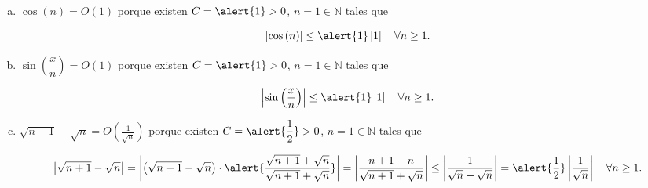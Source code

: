 \documentclass[
	spanish,
	8pt,
	utf8,
	xcolor=table,
	handout,
	aspectratio=169,
	professionalfonts,
	mathserif,
	leqno,
]{beamer}
\begin{document}
\begin{frame}
\begin{solution}
\begin{enumerate}[a)]
			\item

			      \begin{math}
				      \cos\left(n\right)=
				      O\left(1\right)
			      \end{math}
			      porque existen $C=\alert{1}>0$, $n=1\in\mathbb{N}$ tales
			      que

			      \begin{equation*}
				      \left|
				      \cos\left(n\right)
				      \right|\leq
				      \alert{1}\left|
				      1
				      \right|\quad
				      \forall n\geq 1.
			      \end{equation*}

			\item

			      \begin{math}
				      \sin\left(\dfrac{x}{n}\right)=
				      O\left(1\right)
			      \end{math}
			      porque existen $C=\alert{1}>0$, $n=1\in\mathbb{N}$ tales
			      que

			      \begin{equation*}
				      \left|
				      \sin\left(\frac{x}{n}\right)
				      \right|\leq
				      \alert{1}\left|
				      1
				      \right|\quad
				      \forall n\geq 1.
			      \end{equation*}

			\item

			      \begin{math}
				      \sqrt{n+1}-\sqrt{n}=
				      O\left(\frac{1}{\sqrt{n}}\right)
			      \end{math}
			      porque existen $C=\alert{\dfrac{1}{2}}>0$,
			      $n=1\in\mathbb{N}$ tales que

			      \begin{equation*}
				      \left|
				      \sqrt{n+1}-\sqrt{n}
				      \right|=
				      \left|
				      \left(\sqrt{n+1}-\sqrt{n}\right)\cdot
				      \alert{\frac{\sqrt{n+1}+\sqrt{n}}{\sqrt{n+1}+\sqrt{n}}}
				      \right|=
				      \left|
				      \frac{n+1-n}{\sqrt{n+1}+\sqrt{n}}
				      \right|
				      \leq
				      \left|
				      \frac{1}{\sqrt{n}+\sqrt{n}}
				      \right|=
				      \alert{\dfrac{1}{2}}
				      \left|
				      \frac{1}{\sqrt{n}}
				      \right|
				      \quad
				      \forall n\geq 1.
			      \end{equation*}
		\end{enumerate}
	\end{solution}
\end{frame}
\end{document}
